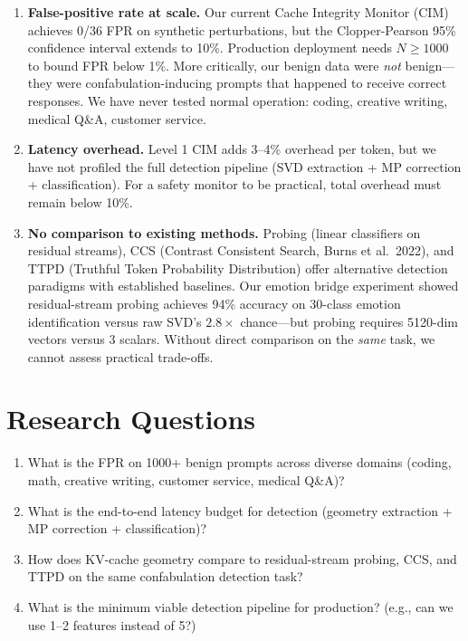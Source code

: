 \documentclass[11pt,letterpaper]{article}
\begin{document}
\begin{enumerate}[leftmargin=*]
  \item \textbf{False-positive rate at scale.} Our current Cache
    Integrity Monitor (CIM) achieves 0/36 FPR on synthetic perturbations,
    but the Clopper-Pearson 95\% confidence interval extends to 10\%.
    Production deployment needs $N \geq 1000$ to bound FPR below 1\%.
    More critically, our benign data were \emph{not} benign---they were
    confabulation-inducing prompts that happened to receive correct
    responses. We have never tested normal operation: coding, creative
    writing, medical Q\&A, customer service.

  \item \textbf{Latency overhead.} Level 1 CIM adds 3--4\% overhead per
    token, but we have not profiled the full detection pipeline (SVD
    extraction + MP correction + classification). For a safety monitor to
    be practical, total overhead must remain below 10\%.

  \item \textbf{No comparison to existing methods.} Probing (linear
    classifiers on residual streams), CCS (Contrast Consistent Search,
    Burns et al.\ 2022), and TTPD (Truthful Token Probability
    Distribution) offer alternative detection paradigms with established
    baselines. Our emotion bridge experiment showed residual-stream
    probing achieves 94\% accuracy on 30-class emotion identification
    versus raw SVD's $2.8\times$ chance---but probing requires 5120-dim
    vectors versus 3 scalars. Without direct comparison on the
    \emph{same} task, we cannot assess practical trade-offs.
\end{enumerate}

\section{Research Questions}

\begin{enumerate}[leftmargin=*]
  \item What is the FPR on 1000+ benign prompts across diverse domains
    (coding, math, creative writing, customer service, medical Q\&A)?

  \item What is the end-to-end latency budget for detection (geometry
    extraction + MP correction + classification)?

  \item How does KV-cache geometry compare to residual-stream probing,
    CCS, and TTPD on the same confabulation detection task?

  \item What is the minimum viable detection pipeline for production?
    (e.g., can we use 1--2 features instead of 5?)
\end{enumerate}
\end{document}
